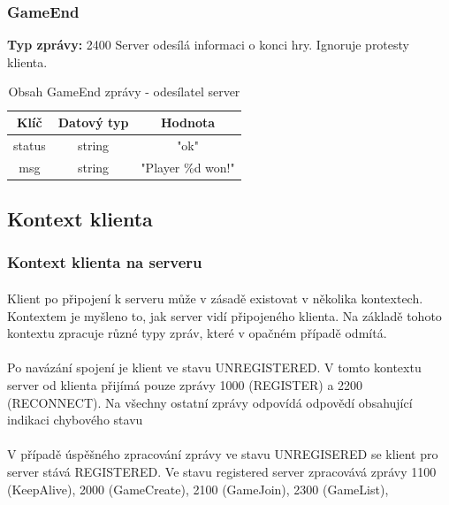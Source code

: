 \documentclass[12pt, a4paper]{article}
\begin{document}
\subsubsection{GameEnd}
\textbf{Typ zprávy: } 2400 \newline
Server odesílá informaci o konci hry. Ignoruje protesty klienta. \newline

    \begin{table}[H]
        \centering
        \begin{tabular}{|c|c|c|}
            \hline
            Klíč & Datový typ & Hodnota \\
            \hline
            \hline
            status & string & "ok" \\
            \hline
            msg & string & "Player \%d won!" \\
            \hline
        \end{tabular}
        \caption{Obsah GameEnd zprávy - odesílatel server}
    \end{table}

\newpage
\subsection{Kontext klienta}
\subsubsection{Kontext klienta na serveru}
\paragraph{}
Klient po připojení k serveru může v zásadě existovat v několika kontextech. Kontextem je myšleno to, jak server vidí
připojeného klienta. Na základě tohoto kontextu zpracuje různé typy zpráv, které v opačném případě odmítá.
\paragraph{}
Po navázání spojení je klient ve stavu UNREGISTERED. V tomto kontextu server od klienta přijímá pouze zprávy 1000
(REGISTER) a 2200 (RECONNECT). Na všechny ostatní zprávy odpovídá odpovědí obsahující indikaci chybového stavu
\paragraph{}
V případě úspěšného zpracování zprávy ve stavu UNREGISERED se klient pro server stává REGISTERED. Ve stavu
registered server zpracovává zprávy 1100 (KeepAlive), 2000 (GameCreate),
2100 (GameJoin), 2300 (GameList),
\end{document}

